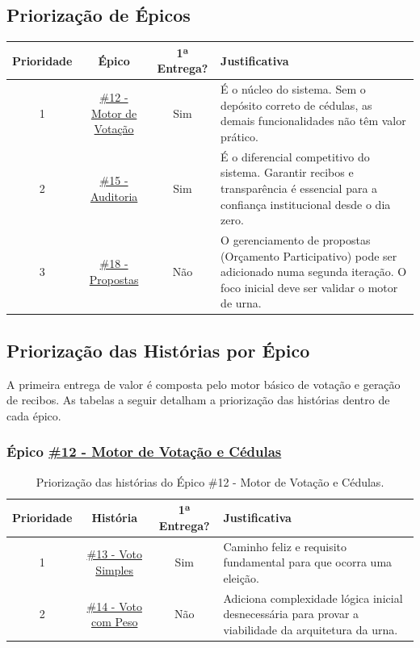 \documentclass[12pt,a4paper]{article}
\begin{document}
\subsection{Priorização de Épicos}
\begin{table}[H]
\centering
\begin{tabularx}{\textwidth}{c c c X}
\toprule
\textbf{Prioridade} & \textbf{Épico} & \textbf{1ª Entrega?} & \textbf{Justificativa} \\
\midrule
1 & \href{https://github.com/gsscala/MC656/issues/12}{\#12 - Motor de Votação} & Sim & É o núcleo do sistema. Sem o depósito correto de cédulas, as demais funcionalidades não têm valor prático. \\
2 & \href{https://github.com/gsscala/MC656/issues/15}{\#15 - Auditoria} & Sim & É o diferencial competitivo do sistema. Garantir recibos e transparência é essencial para a confiança institucional desde o dia zero. \\
3 & \href{https://github.com/gsscala/MC656/issues/18}{\#18 - Propostas} & Não & O gerenciamento de propostas (Orçamento Participativo) pode ser adicionado numa segunda iteração. O foco inicial deve ser validar o motor de urna. \\
\bottomrule
\end{tabularx}
\end{table}

\subsection{Priorização das Histórias por Épico}
A primeira entrega de valor é composta pelo motor básico de votação e geração de recibos. As tabelas a seguir detalham a priorização das histórias dentro de cada épico.

\subsubsection*{Épico \href{https://github.com/gsscala/MC656/issues/12}{\#12 - Motor de Votação e Cédulas}}
\begin{table}[H]
\centering
\begin{tabularx}{\textwidth}{c c c X}
\toprule
\textbf{Prioridade} & \textbf{História} & \textbf{1ª Entrega?} & \textbf{Justificativa} \\
\midrule
1 & \href{https://github.com/gsscala/MC656/issues/13}{\#13 - Voto Simples} & Sim & Caminho feliz e requisito fundamental para que ocorra uma eleição. \\
2 & \href{https://github.com/gsscala/MC656/issues/14}{\#14 - Voto com Peso} & Não & Adiciona complexidade lógica inicial desnecessária para provar a viabilidade da arquitetura da urna. \\
\bottomrule
\end{tabularx}
\caption{Priorização das histórias do Épico \#12 - Motor de Votação e Cédulas.}
\end{table}
\end{document}
